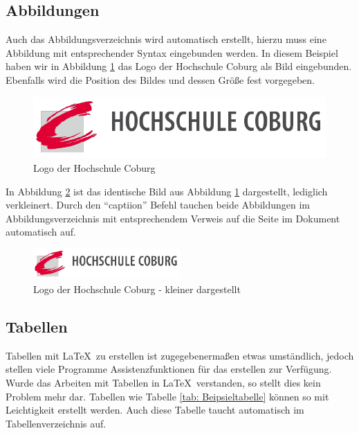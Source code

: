 \subsection{Abbildungen}

Auch das Abbildungsverzeichnis wird automatisch erstellt, hierzu muss eine Abbildung mit entsprechender Syntax eingebunden werden. In diesem Beispiel haben wir in Abbildung \ref{fig: Logo der Hochschule Coburg} das Logo der Hochschule Coburg als Bild eingebunden. Ebenfalls wird die Position des Bildes und dessen Größe fest vorgegeben. 

\begin{figure}[hp]
	\centering
	\includegraphics[width=1\textwidth]{Bilder/Titelseite/Logo_HS_Coburg}
	\caption{Logo der Hochschule Coburg}
	\label{fig: Logo der Hochschule Coburg}
\end{figure}

In Abbildung \ref{fig: Logo der Hochschule Coburg - kleiner dargestellt} ist das identische Bild aus Abbildung \ref{fig: Logo der Hochschule Coburg} dargestellt, lediglich verkleinert. Durch den \enquote{captiion} Befehl tauchen beide Abbildungen im Abbildungsverzeichnis mit entsprechendem Verweis auf die Seite im Dokument automatisch auf.

\begin{figure}[hp]
	\centering
	\includegraphics[width=0.5\textwidth]{Bilder/Titelseite/Logo_HS_Coburg}
	\caption{Logo der Hochschule Coburg - kleiner dargestellt}
	\label{fig: Logo der Hochschule Coburg - kleiner dargestellt}
\end{figure}

\newpage

\subsection{Tabellen}

Tabellen mit \LaTeX\ zu erstellen ist zugegebenermaßen etwas umständlich, jedoch stellen viele Programme Assistenzfunktionen für das erstellen zur Verfügung. Wurde das Arbeiten mit Tabellen in \LaTeX\ verstanden, so stellt dies kein Problem mehr dar. Tabellen wie Tabelle \ref{tab: Beipsieltabelle} können so mit Leichtigkeit erstellt werden. Auch diese Tabelle taucht automatisch im Tabellenverzeichnis auf.

